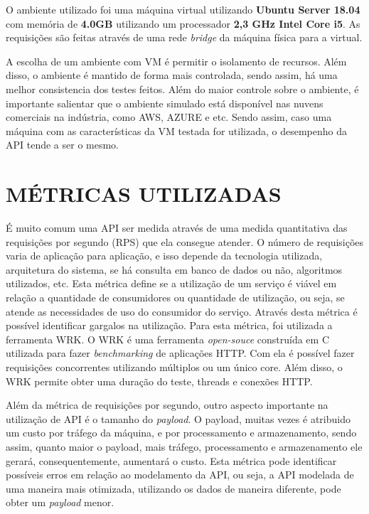 O ambiente utilizado foi uma máquina virtual utilizando \textbf{Ubuntu Server 18.04}
com memória de \textbf{4.0GB} utilizando um processador \textbf{2,3 GHz Intel Core i5}. 
As requisições são feitas através de uma rede \textit{bridge} da máquina física para a virtual.

A escolha de um ambiente com VM é permitir o isolamento de recursos. Além disso,
o ambiente é mantido de forma mais controlada, sendo assim, há uma melhor 
consistencia dos testes feitos. Além do maior controle sobre o ambiente, é importante salientar 
que o ambiente simulado está disponível nas nuvens comerciais na indústria, como AWS, AZURE e 
etc. Sendo assim, caso uma máquina com as características da VM testada for utilizada, 
o desempenho da API tende a ser o mesmo.

\section{MÉTRICAS UTILIZADAS}
É muito comum uma API ser medida através de uma medida quantitativa das requisições 
por segundo (RPS) que ela consegue atender. O número de requisições 
varia de aplicação para aplicação, e isso depende da tecnologia utilizada, 
arquitetura do sistema, se há consulta em banco de dados ou não, algoritmos utilizados, etc.
Esta métrica define se a utilização de um serviço é viável em relação a quantidade de consumidores ou
quantidade de utilização, ou seja, se atende as necessidades de uso do consumidor do serviço. 
Através desta métrica é possível identificar gargalos na utilização. Para esta métrica, foi utilizada 
a ferramenta WRK. O WRK é uma ferramenta \textit{open-souce} construída em C utilizada 
para fazer \textit{benchmarking} de aplicações HTTP. Com ela é possível fazer requisições 
concorrentes utilizando múltiplos ou um único core. Além disso, o WRK permite obter uma duração
do teste, threads e conexões HTTP.

Além da métrica de requisições por segundo, outro aspecto importante na utilização de API
é o tamanho do \textit{payload}. O payload, muitas vezes é atribuido um custo por 
tráfego da máquina, e por processamento e armazenamento, sendo assim, quanto maior
o payload, mais tráfego, processamento e armazenamento ele gerará, consequentemente,
aumentará o custo. Esta métrica pode identificar possíveis erros em relação 
ao modelamento da API, ou seja, a API modelada de uma maneira mais otimizada, utilizando os dados
de maneira diferente, pode obter um \textit{payload} menor.

